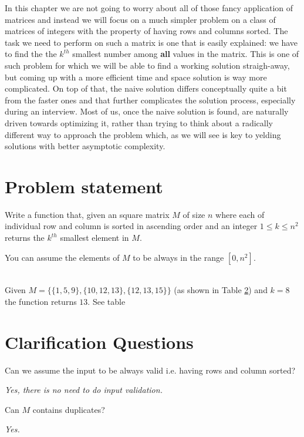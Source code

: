 In this chapter we are not going to worry about all of those fancy application of matrices and instead we will focus on a much simpler problem on a class of matrices of integers with the property of having rows and columns sorted. The task we need to perform on such a matrix is one that is easily explained: we have to find the the $k^{th}$ smallest number among \textbf{all} values in the matrix.
This is one of such problem for which we will be able to find a working solution straigh-away, but coming up with a more efficient time and space solution is way more complicated. 
On top of that, the naive solution differs conceptually  quite a bit from the faster ones and that further complicates the solution process, especially during an interview. Most of us, once the naive solution is found, are naturally driven towards optimizing it, rather than trying to think about a radically different way to approach the problem which, as we will see is key to yelding solutions with better asymptotic complexity.



\section{Problem statement}
\begin{exercise}
\label{example:kth_smallest_in_sorted_matrix:exercice1}
Write a function that, given an square matrix $M$ of size $n$  where each of individual row and column is sorted in ascending order and an integer $1 \leq k \leq n^2$
returns the $k^{th}$ smallest element in $M$.


You can assume the elements of $M$ to be always in the range $[0,n^2]$.

	\begin{example}
		\label{example:kth_smallest_in_sorted_matrix:example1}
		\hfill \\
		Given $M=\{\{1,5,9\},\{10,12,13\},\{12,13,15\}\}$ (as shown in Table \ref{}) and $k=8$ the function returns $13$. See table
	\end{example}
\end{exercise}




\section{Clarification Questions}

\begin{QandA}
	\item Can we assume the input to be always valid i.e. having rows and column sorted?
	\begin{answered}
		\textit{Yes, there is no need to do input validation.}
	\end{answered}
	
	\item Can $M$ contains duplicates?
	\begin{answered}
		\textit{Yes.}
	\end{answered}
	
\end{QandA}


